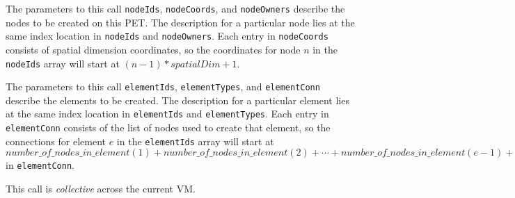      The parameters to this call {\tt nodeIds}, {\tt nodeCoords}, and
     {\tt nodeOwners} describe the nodes to be created on this PET.
     The description for a particular node lies at the same index location in
     {\tt nodeIds} and {\tt nodeOwners}. Each entry
     in {\tt nodeCoords} consists of spatial dimension coordinates, so the coordinates
     for node $n$ in the {\tt nodeIds} array will start at $(n-1)*spatialDim+1$.
  
     The parameters to this call {\tt elementIds}, {\tt elementTypes}, and
     {\tt elementConn} describe the elements to be created. The description
     for a particular element lies at the same index location in {\tt elementIds}
     and {\tt elementTypes}. Each entry in {\tt elementConn} consists of the list of
     nodes used to create that element, so the connections for element $e$ in the
     {\tt elementIds} array will start at $number\_of\_nodes\_in\_element(1) + number\_of\_nodes\_in\_element(2) +
     \cdots + number\_of\_nodes\_in\_element(e-1) + 1$ in {\tt elementConn}.
  
     This call is {\em collective} across the current VM.
  
